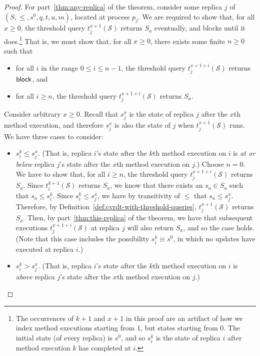\begin{proof}
For part~\ref{thm:any-replica} of the theorem, consider some replica
$j$ of $(S, \leq, s^0, q, t, u, m)$, located at process $p_j$.  We are
required to show that, for all $x \geq 0$, the threshold query
$t^{x+1}_j(\mathcal{S})$ returns $S_a$ eventually, and blocks until it
does.\footnote{The occurrences of $k+1$ and $x+1$ in this proof are an
  artifact of how we index method executions starting from $1$, but
  states starting from $0$.  The initial state (of every replica) is
  $s^0$, and so $s^k_i$ is the state of replica $i$ after method
  execution $k$ has completed at $i$.}
That is, we must show that, for all $x \geq 0$, there exists some
finite $n \geq 0$ such that
\begin{itemize}
\item 
for all $i$ in the range $0 \leq i \leq n-1$, the threshold query
$t^{x+1+i}_j(\mathcal{S})$ returns $\textsf{block}$, and
\item
for all $i \geq n$, the threshold query $t^{x+1+i}_j(\mathcal{S})$
returns $S_a$.
\end{itemize}
Consider arbitrary $x \geq 0$.  Recall that $s^x_j$ is the state of
replica $j$ after the $x$th method execution, and therefore $s^x_j$ is
also the state of $j$ when $t^{x+1}_j(\mathcal{S})$ runs.
%
We have three cases to consider:
\begin{itemize}
\item $s^k_i \leq s^x_j$.
(That is, replica $i$'s state after the $k$th method execution on $i$
is \emph{at or below} replica $j$'s state after the $x$th method
execution on $j$.)
%
Choose $n = 0$.  We have to show that, for all $i \geq n$, the
threshold query $t^{x+1+i}_j(\mathcal{S})$ returns $S_a$.  Since
$t^{k+1}_i(\mathcal{S})$ returns $S_a$, we know that there exists an
$s_a \in S_a$ such that $s_a \leq s^k_i$.  Since $s^k_i \leq s^x_j$,
we have by transitivity of $\leq$ that $s_a \leq s^x_j$.  Therefore,
by Definition~\ref{def:cvrdt-with-threshold-queries},
$t^{x+1}_j(\mathcal{S})$ returns $S_a$.  Then, by
part~\ref{thm:this-replica} of the theorem, we have that subsequent
executions $t^{x+1+i}_j(\mathcal{S})$ at replica $j$ will also return
$S_a$, and so the case holds.  (Note that this case includes the
possibility $s^k_i \equiv s^0$, in which no updates have executed at
replica $i$.)

\item $s^k_i > s^x_j$.
(That is, replica $i$'s state after the $k$th method execution on $i$
is \emph{above} replica $j$'s state after the $x$th method execution
on $j$.)


\end{itemize}
\end{proof}

